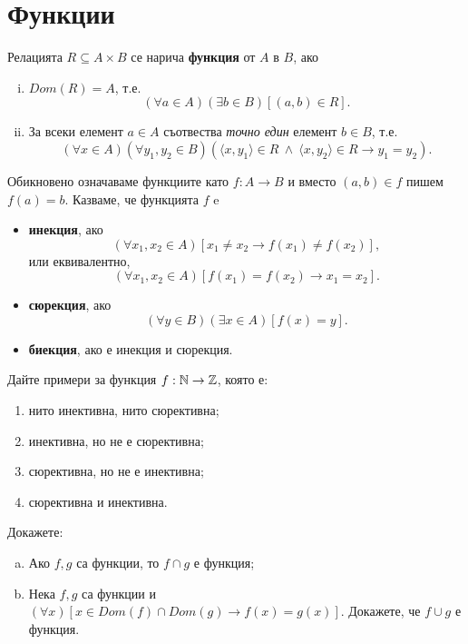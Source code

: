 \section*{Функции}

Релацията $R \subseteq A\times B$ се нарича {\bf функция} от $A$ в $B$, ако
\begin{enumerate}[i)]
  \item
    $Dom(R) = A$, т.е.
    \[(\forall a\in A)(\exists b\in B)[(a,b)\in R].\]
  \item
    За всеки елемент $a\in A$ съотвества {\em точно един} елемент $b \in B$, т.е.
    \[(\forall x\in A)(\forall y_1,y_2 \in B)(\langle{x,y_1}\rangle\in R\ \wedge\ \langle{x,y_2}\rangle\in R \rightarrow y_1 = y_2).\]
\end{enumerate}
Обикновено означаваме функциите като $f:A\to B$ и
вместо $(a,b)\in f$ пишем $f(a) = b$.
Казваме, че функцията $f$ e
\begin{itemize}
\item
  {\bf инекция}, ако 
  \[(\forall x_1,x_2\in A)[x_1\neq x_2 \rightarrow f(x_1)\neq f(x_2)],\]
  или еквивалентно,
  \[(\forall x_1,x_2\in A)[f(x_1) = f(x_2) \rightarrow x_1 = x_2].\]
\item
  {\bf сюрекция}, ако 
  \[(\forall y\in B)(\exists x\in A)[f(x) = y].\]
\item
  {\bf биекция}, ако е инекция и сюрекция.
\end{itemize}

\begin{problem}
  Дайте примери за функция $f:\mathbb{N}\rightarrow\mathbb{Z}$, която е:
  \begin{enumerate}
  \item
    нито инективна, нито сюрективна;
  \item
    инективна, но не е сюрективна;
  \item
    сюрективна, но не е инективна;
  \item
    сюрективна и инективна.
  \end{enumerate}
\end{problem}

\begin{problem}
  Докажете:
  \begin{enumerate}[a)]
  \item
    Ако $f,g$ са функции, то $f\cap g$ е функция;
  \item
    Нека $f,g$ са функции и $(\forall x)[x\in Dom(f)\cap Dom(g)\rightarrow f(x) = g(x)]$.
    Докажете, че $f\cup g$ е функция.
  \end{enumerate}
\end{problem}

